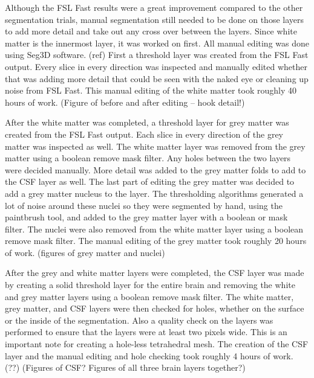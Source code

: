 Although the FSL Fast results were a great improvement compared to the other segmentation trials, manual segmentation still needed to be done on those layers to add more detail and take out any cross over between the layers. Since white matter is the innermost layer, it was worked on first. All manual editing was done using Seg3D software. (ref) First a threshold layer was created from the FSL Fast output. Every slice in every direction was inspected and manually edited whether that was adding more detail that could be seen with the naked eye or cleaning up noise from FSL Fast. This manual editing of the white matter took roughly 40 hours of work. (Figure of before and after editing -- hook detail!) 

After the white matter was completed, a threshold layer for grey matter was created from the FSL Fast output. Each slice in every direction of the grey matter was inspected as well. The white matter layer was removed from the grey matter using a boolean remove mask filter. Any holes between the two layers were decided manually. More detail was added to the grey matter folds to add to the CSF layer as well. The last part of editing the grey matter was decided to add a grey matter nucleus to the layer. The thresholding algorithms generated a lot of noise around these nuclei so they were segmented by hand, using the paintbrush tool, and added to the grey matter layer with a boolean or mask filter. The nuclei were also removed from the white matter layer using a boolean remove mask filter. The manual editing of the grey matter took roughly 20 hours of work. (figures of grey matter and nuclei)

After the grey and white matter layers were completed, the CSF layer was made by creating a solid threshold layer for the entire brain and removing the white and grey matter layers using a boolean remove mask filter. The white matter, grey matter, and CSF layers were then checked for holes, whether on the surface or the inside of the segmentation. Also a quality check on the layers was performed to ensure that the layers were at least two pixels wide. This is an important note for creating a hole-less tetrahedral mesh. The creation of the CSF layer and the manual editing and hole checking took roughly 4 hours of work. (??) (Figures of CSF? Figures of all three brain layers together?)

